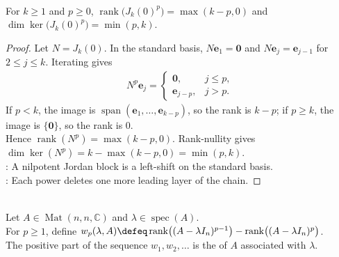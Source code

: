 \begin{lemma} \label{lem:nilpotent-jordan-block-power-rank} \\
For $k\geq1$ and $p\geq0$, $\operatorname{rank}\bigl(J_k(0)^p\bigr)=\max(k-p,0)$ and $\dim\ker\bigl(J_k(0)^p\bigr)=\min(p,k)$.
\begin{proof}
Let $N=J_k(0)$. In the standard basis, $N\mathbf{e}_1=\mathbf{0}$ and $N\mathbf{e}_j=\mathbf{e}_{j-1}$ for $2\leq j\leq k$. Iterating gives
\begin{align}
N^p\mathbf{e}_j=
\begin{cases}
\mathbf{0}, & j\leq p,\\
\mathbf{e}_{j-p}, & j>p.
\end{cases} \nonumber
\end{align}
If $p<k$, the image is $\operatorname{span}(\mathbf{e}_1,\ldots,\mathbf{e}_{k-p})$, so the rank is $k-p$; if $p\geq k$, the image is $\{\mathbf{0}\}$, so the rank is $0$.\\
Hence $\operatorname{rank}(N^p)=\max(k-p,0)$. Rank-nullity gives $\dim\ker(N^p)=k-\max(k-p,0)=\min(p,k)$.\\
: A nilpotent Jordan block is a left-shift on the standard basis.\\
: Each power deletes one more leading layer of the chain.
\end{proof}
\end{lemma}

\begin{definition} \label{def:weyr-characteristic} \\
Let $A\in\operatorname{Mat}(n,n,\mathbb{C})$ and $\lambda\in\operatorname{spec}(A)$.\\
For $p\geq1$, define $w_p(\lambda,A)\defeq \operatorname{rank}\bigl((A-\lambda I_n)^{p-1}\bigr) - \operatorname{rank}\bigl((A-\lambda I_n)^p\bigr)$.\\
The positive part of the sequence $w_1,w_2,\ldots$ is the  of $A$ associated with $\lambda$.
\end{definition}

